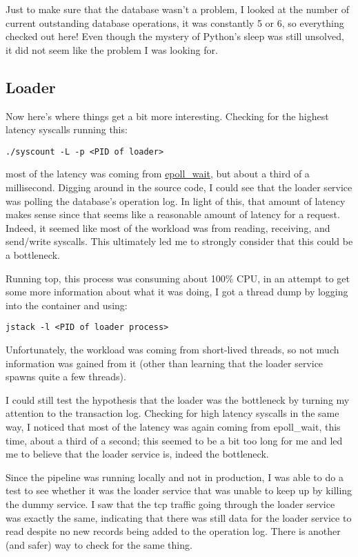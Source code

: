 \documentclass[11pt]{article}
\begin{document}
Just to make sure that the database wasn't a problem, I looked at the number of current outstanding database operations, it was constantly 5 or 6, so everything checked out here!
Even though the mystery of Python's sleep was still unsolved, it did not seem like the problem I was looking for.

\subsection*{Loader}
\label{sec:orgf55f036}
Now here's where things get a bit more interesting.
Checking for the highest latency syscalls running this:
\begin{verbatim}
./syscount -L -p <PID of loader>
\end{verbatim}
most of the latency was coming from \href{http://man7.org/linux/man-pages/man2/epoll\_wait.2.html}{epoll\_wait}, but about a third of a millisecond. Digging around in the source code, I could see that the loader service was polling the database's operation log.
In light of this, that amount of latency makes sense since that seems like a reasonable amount of latency for a request. Indeed, it seemed like most of the workload was from reading,
receiving, and send/write syscalls. This ultimately led me to strongly consider that this could be a bottleneck.

Running top, this process was consuming about 100\% CPU, in an attempt to get some more information about what it was doing, I got a thread dump by logging into the container and using:
\begin{verbatim}
jstack -l <PID of loader process>
\end{verbatim}
Unfortunately, the workload was coming from short-lived threads, so not much information was gained from it (other than learning that the loader service spawns quite a few threads).

I could still test the hypothesis that the loader was the bottleneck by turning my attention to the transaction log. Checking for high latency syscalls in the same way,
I noticed that most of the latency was again coming from epoll\_wait, this time, about a third of a second; this seemed to be a bit too long for me and led me to believe that the loader service is,
indeed the bottleneck.

Since the pipeline was running locally and not in production, I was able to do a test to see whether it was the loader service that was unable to keep up by killing the dummy service.
I saw that the tcp traffic going through the loader service was exactly the same, indicating that there was still data for the loader service to read despite no new records being added
to the operation log. There is another (and safer) way to check for the same thing.
\end{document}
